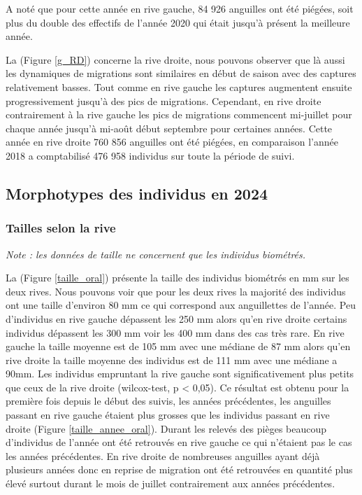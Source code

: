 \documentclass[11pt,titlepage,twoside]{article}\usepackage[]{graphicx}\usepackage[table]{xcolor}
\begin{document}
A noté que pour cette année en rive gauche, 84 926 anguilles ont été piégées, soit plus du double des effectifs de l’année 2020 qui était jusqu’à présent la meilleure année.


La (Figure \ref{g_RD}) concerne la rive droite, nous pouvons observer que là aussi les dynamiques de migrations sont similaires en début de saison avec des captures relativement basses. Tout comme en rive gauche les captures augmentent ensuite progressivement jusqu’à des pics de migrations. Cependant, en rive droite contrairement à la rive gauche les pics de migrations commencent mi-juillet pour chaque année jusqu’à mi-août début septembre pour certaines années. Cette année en rive droite 760 856 anguilles ont été piégées, en comparaison l’année 2018 a comptabilisé 476 958 individus sur toute la période de suivi. 


\subsection{Morphotypes des individus en 2024}

\subsubsection{Tailles selon la rive}

\textit{Note : les données de taille ne concernent que les individus biométrés. }

La (Figure \ref{taille_oral}) présente la taille des individus biométrés en mm sur les deux rives. Nous pouvons voir que pour les deux rives la majorité des individus ont une taille d’environ 80 mm ce qui correspond aux anguillettes de l’année. Peu d’individus en rive gauche dépassent les 250 mm alors qu’en rive droite certains individus dépassent les 300 mm voir les 400 mm dans des cas très rare. En rive gauche la taille moyenne est de 105 mm avec une médiane de 87 mm alors qu’en rive droite la taille moyenne des individus est de 111 mm avec une médiane a 90mm. Les individus empruntant la rive gauche sont significativement plus petits que ceux de la rive droite (wilcox-test, p < 0,05). Ce résultat est obtenu pour la première fois depuis le début des suivis, les années précédentes, les anguilles passant en rive gauche étaient plus grosses que les individus passant en rive droite (Figure \ref{taille_annee_oral}). Durant les relevés des pièges beaucoup d’individus de l’année ont été retrouvés en rive gauche ce qui n’étaient pas le cas les années précédentes. En rive droite de nombreuses anguilles ayant déjà plusieurs années donc en reprise de migration ont été retrouvées en quantité plus élevé surtout durant le mois de juillet contrairement aux années précédentes. 
\end{document}

